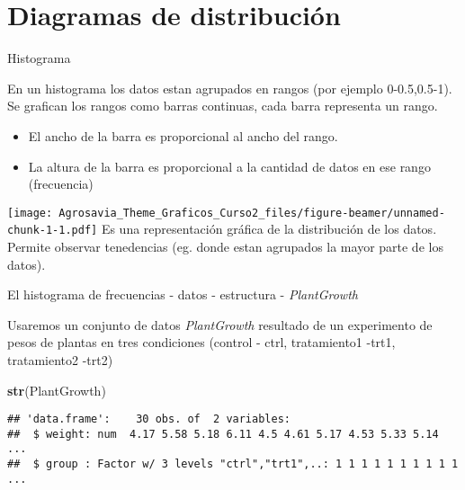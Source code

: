 \documentclass[ignorenonframetext,]{beamer}
\newenvironment{Shaded}{\begin{snugshade}}{\end{snugshade}}
\newcommand{\KeywordTok}[1]{\textcolor[rgb]{0.13,0.29,0.53}{\textbf{#1}}}
\newcommand{\NormalTok}[1]{#1}
\begin{document}
\section{Diagramas de distribución}\label{diagramas-de-distribucion}

\begin{frame}{Histograma}

En un histograma los datos estan agrupados en rangos (por ejemplo
0-0.5,0.5-1). Se grafican los rangos como barras continuas, cada barra
representa un rango.

\begin{itemize}
\item El ancho de la barra es proporcional al ancho del rango. 
\item La altura de la barra es proporcional a la cantidad de datos en ese rango (frecuencia)
\end{itemize}

\texttt{[image: Agrosavia\_Theme\_Graficos\_Curso2\_files/figure-beamer/unnamed-chunk-1-1.pdf]}
Es una representación gráfica de la distribución de los datos. Permite
observar tenedencias (eg. donde estan agrupados la mayor parte de los
datos).

\end{frame}

\begin{frame}[fragile]{El histograma de frecuencias - datos - estructura
- \textit{PlantGrowth}}

Usaremos un conjunto de datos \textit{PlantGrowth} resultado de un
experimento de pesos de plantas en tres condiciones (control - ctrl,
tratamiento1 -trt1, tratamiento2 -trt2)

\begin{Shaded}
\begin{Highlighting}[]
\KeywordTok{str}\NormalTok{(PlantGrowth)}
\end{Highlighting}
\end{Shaded}

\begin{verbatim}
## 'data.frame':    30 obs. of  2 variables:
##  $ weight: num  4.17 5.58 5.18 6.11 4.5 4.61 5.17 4.53 5.33 5.14 ...
##  $ group : Factor w/ 3 levels "ctrl","trt1",..: 1 1 1 1 1 1 1 1 1 1 ...
\end{verbatim}

\end{frame}
\end{document}
